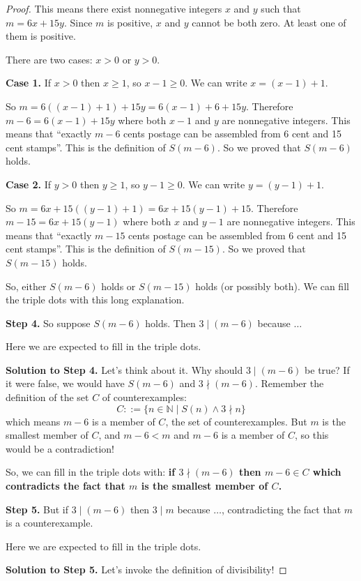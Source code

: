 \documentclass[14pt]{extarticle}
\begin{document}
\begin{proof}
This means there exist nonnegative integers $x$ and $y$ such that $m = 6x + 15y$. Since $m$ is positive, $x$ and $y$ cannot be both zero. At least one of them is positive.

There are two cases: $x > 0$ or $y > 0$. 

\textbf{Case 1.} If $x > 0$ then $x \geq 1$, so $x - 1 \geq 0$. We can write $x = (x - 1) + 1$.

So $m = 6((x-1) + 1) + 15y = 6(x-1) + 6 + 15y$. Therefore $m - 6 = 6(x-1) + 15y$ where both $x-1$ and $y$ are nonnegative integers. This means that ``exactly $m-6$ cents postage can be assembled from 6 cent and 15 cent stamps''. This is the definition of $S(m-6)$. So we proved that $S(m-6)$ holds.

\textbf{Case 2.} If $y > 0$ then $y \geq 1$, so $y - 1 \geq 0$. We can write $y = (y - 1) + 1$.

So $m = 6x + 15((y-1) + 1) = 6x + 15(y-1) + 15$. Therefore $m - 15 = 6x + 15(y-1)$ where both $x$ and $y-1$ are nonnegative integers. This means that ``exactly $m-15$ cents postage can be assembled from 6 cent and 15 cent stamps''. This is the definition of $S(m-15)$. So we proved that $S(m-15)$ holds.

So, either $S(m-6)$ holds or $S(m-15)$ holds (or possibly both). We can fill the triple dots with this long explanation.

\textbf{Step 4.} So suppose $S(m-6)$ holds. Then $3 \mid (m-6)$ because $\ldots$

Here we are expected to fill in the triple dots. 

\textbf{Solution to Step 4.} Let's think about it. Why should $3 \mid (m-6)$ be true? If it were false, we would have $S(m-6)$ and $3 \nmid (m-6)$. Remember the definition of the set $C$ of counterexamples:
$$
C::= \{n \in \mathbb{N} \mid S(n) \wedge 3 \nmid n\}
$$
which means $m-6$ is a member of $C$, the set of counterexamples. But $m$ is the smallest member of $C$, and $m-6 < m$ and $m-6$ is a member of $C$, so this would be a contradiction!

So, we can fill in the triple dots with: \textbf{if $3 \nmid (m-6)$ then $m - 6 \in C$ which contradicts the fact that $m$ is the smallest member of $C$.}

{\bf Step 5.} But if $3 \mid (m-6)$ then $3 \mid m$ because $\ldots$, contradicting the fact that $m$ is a counterexample.

Here we are expected to fill in the triple dots. 

\textbf{Solution to Step 5.} Let's invoke the definition of divisibility! 


\end{proof}
\end{document}
